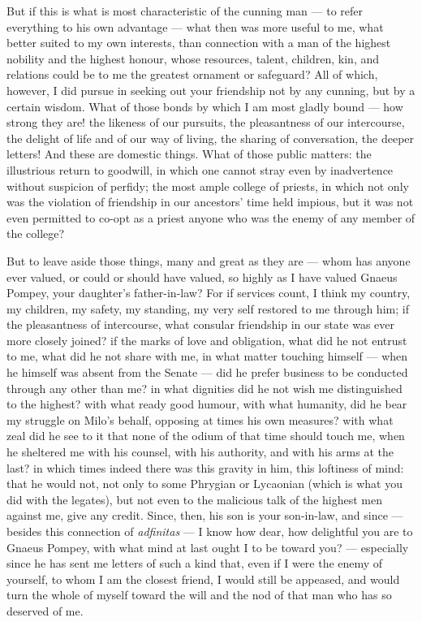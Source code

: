  But if this is what is most characteristic of the cunning man --- to refer everything to his own advantage --- what then was more useful to me, what better suited to my own interests, than connection with a man of the highest nobility and the highest honour, whose resources, talent, children, kin, and relations could be to me the greatest ornament or safeguard? All of which, however, I did pursue in seeking out your friendship not by any cunning, but by a certain wisdom. What of those bonds by which I am most gladly bound --- how strong they are! the likeness of our pursuits, the pleasantness of our intercourse, the delight of life and of our way of living, the sharing of conversation, the deeper letters! And these are domestic things. What of those public matters: the illustrious return to goodwill, in which one cannot stray even by inadvertence without suspicion of perfidy; the most ample college of priests, in which not only was the violation of friendship in our ancestors' time held impious, but it was not even permitted to co-opt as a priest anyone who was the enemy of any member of the college?

 But to leave aside those things, many and great as they are --- whom has anyone ever valued, or could or should have valued, so highly as I have valued Gnaeus Pompey, your daughter's father-in-law? For if services count, I think my country, my children, my safety, my standing, my very self restored to me through him; if the pleasantness of intercourse, what consular friendship in our state was ever more closely joined? if the marks of love and obligation, what did he not entrust to me, what did he not share with me, in what matter touching himself --- when he himself was absent from the Senate --- did he prefer business to be conducted through any other than me? in what dignities did he not wish me distinguished to the highest? with what ready good humour, with what humanity, did he bear my struggle on Milo's behalf, opposing at times his own measures? with what zeal did he see to it that none of the odium of that time should touch me, when he sheltered me with his counsel, with his authority, and with his arms at the last? in which times indeed there was this gravity in him, this loftiness of mind: that he would not, not only to some Phrygian or Lycaonian (which is what you did with the legates), but not even to the malicious talk of the highest men against me, give any credit. Since, then, his son is your son-in-law, and since --- besides this connection of \textit{adfinitas} --- I know how dear, how delightful you are to Gnaeus Pompey, with what mind at last ought I to be toward you? --- especially since he has sent me letters of such a kind that, even if I were the enemy of yourself, to whom I am the closest friend, I would still be appeased, and would turn the whole of myself toward the will and the nod of that man who has so deserved of me.

